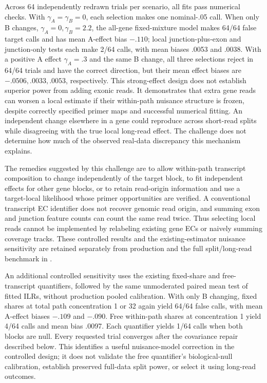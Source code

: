\documentclass[11pt]{article}
\begin{document}
Across 64 independently redrawn trials per scenario, all fits pass numerical checks. With \(\gamma_A=\gamma_B=0\), each selection makes one nominal-.05 call. When only B changes, \(\gamma_A=0,\gamma_B=2.2\), the all-gene fixed-mixture model makes 64/64 false target calls and has mean A-effect bias \(-.110\); local junction-plus-exon and junction-only tests each make 2/64 calls, with mean biases .0053 and .0038. With a positive A effect \(\gamma_A=.3\) and the same B change, all three selections reject in 64/64 trials and have the correct direction, but their mean effect biases are \(-.0506,.0033,.0053\), respectively. This strong-effect design does not establish superior power from adding exonic reads. It demonstrates that extra gene reads can worsen a local estimate if their within-path nuisance structure is frozen, despite correctly specified primer maps and successful numerical fitting. An independent change elsewhere in a gene could reproduce across short-read splits while disagreeing with the true local long-read effect. The challenge does not determine how much of the observed real-data discrepancy this mechanism explains.

The remedies suggested by this challenge are to allow within-path transcript composition to change independently of the target block, to fit independent effects for other gene blocks, or to retain read-origin information and use a target-local likelihood whose primer opportunities are verified. A conventional transcript EC identifier does not recover genomic read origin, and summing exon and junction feature counts can count the same read twice. Thus selecting local reads cannot be implemented by relabeling existing gene ECs or naively summing coverage tracks. These controlled results and the existing-estimator nuisance sensitivity are retained separately from production and the full split/long-read benchmark in .

An additional controlled sensitivity uses the existing fixed-share and free-transcript quantifiers, followed by the same unmoderated paired mean test of fitted ILRs, without production pooled calibration. With only B changing, fixed shares at total path concentration 1 or 32 again yield 64/64 false calls, with mean A-effect biases \(-.109\) and \(-.090\). Free within-path shares at concentration 1 yield 4/64 calls and mean bias .0097. Each quantifier yields 1/64 calls when both blocks are null. Every requested trial converges after the covariance repair described below. This identifies a useful nuisance-model correction in the controlled design; it does not validate the free quantifier's biological-null calibration, establish preserved full-data split power, or select it using long-read outcomes.
\end{document}
